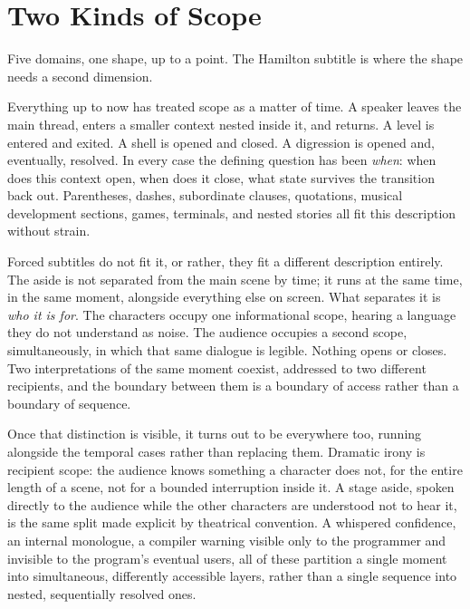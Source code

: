 \documentclass[11pt]{article}
\begin{document}
\section{Two Kinds of Scope}

Five domains, one shape, up to a point. The Hamilton subtitle is where the shape needs a second dimension.

Everything up to now has treated scope as a matter of time. A speaker leaves the main thread, enters a smaller context nested inside it, and returns. A level is entered and exited. A shell is opened and closed. A digression is opened and, eventually, resolved. In every case the defining question has been \emph{when}: when does this context open, when does it close, what state survives the transition back out. Parentheses, dashes, subordinate clauses, quotations, musical development sections, games, terminals, and nested stories all fit this description without strain.

Forced subtitles do not fit it, or rather, they fit a different description entirely. The aside is not separated from the main scene by time; it runs at the same time, in the same moment, alongside everything else on screen. What separates it is \emph{who it is for}. The characters occupy one informational scope, hearing a language they do not understand as noise. The audience occupies a second scope, simultaneously, in which that same dialogue is legible. Nothing opens or closes. Two interpretations of the same moment coexist, addressed to two different recipients, and the boundary between them is a boundary of access rather than a boundary of sequence.

Once that distinction is visible, it turns out to be everywhere too, running alongside the temporal cases rather than replacing them. Dramatic irony is recipient scope: the audience knows something a character does not, for the entire length of a scene, not for a bounded interruption inside it. A stage aside, spoken directly to the audience while the other characters are understood not to hear it, is the same split made explicit by theatrical convention. A whispered confidence, an internal monologue, a compiler warning visible only to the programmer and invisible to the program's eventual users, all of these partition a single moment into simultaneous, differently accessible layers, rather than a single sequence into nested, sequentially resolved ones.
\end{document}
